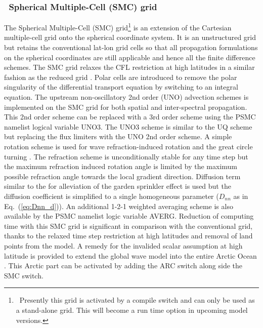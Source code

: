 \vssub
\subsubsection{~Spherical Multiple-Cell (SMC) grid} \label{sub:num_space_SMC}

\noindent
The Spherical Multiple-Cell (SMC) grid\footnote{~Presently this grid is
activated by a compile switch and can only be used as a stand-alone grid. This
will become a run time option in upcoming model versions.}  \citep{art:Li11}
is an extension of the Cartesian multiple-cell grid \citep{art:Li03} onto the
spherical coordinate system. It is an unstructured grid but retains the
conventional lat-lon grid cells so that all propagation formulations on the
spherical coordinates are still applicable and hence all
the finite difference schemes. The SMC grid relaxes the CFL restriction at
high latitudes in a similar fashion as the reduced grid
\citep{art:RA94}. Polar cells are introduced to remove the polar singularity
of the differential transport equation by switching to an integral
equation. The upstream non-oscillatory 2nd order (UNO) advection schemes
\citep{art:Li08} is implemented on the SMC grid for both spatial and
inter-spectral propagation. This 2nd order scheme can be replaced with a 3rd 
order scheme using the {\F PSMC} namelist logical variable {\code UNO3}.  The UNO3 scheme is similar 
to the UQ scheme but replacing the flux limiters with the UNO 2nd order scheme.  A simple 
rotation scheme is used for wave refraction-induced rotation and the great circle 
turning \citep{art:Li12}.  The refraction scheme is unconditionally stable for 
any time step but the maximum refraction induced rotation angle is limited by 
the maximum possible refraction angle towards the local gradient direction.  
Diffusion term similar to the \cite{art:BH87} for alleviation of the garden 
sprinkler effect is used but the diffusion coefficient is simplified to a single 
homogeneous parameter ($D_{nn}$ as in Eq.~(\ref{eq:Dnn_d})).  An additional 
1-2-1 weighted averaging scheme is also available by the {\F PSMC} namelist logic 
variable {\code AVERG}.  Reduction of computing time with this SMC grid is significant 
in comparison with the conventional grid, thanks to the relaxed time step 
restriction at high latitudes and removal of land points from the model.  
A remedy for the invalided scalar assumption at high latitude is provided to 
extend the global wave model into the entire Arctic Ocean \citep{art:Li16}.  This 
Arctic part can be activated by adding the ARC switch along side the SMC switch.

